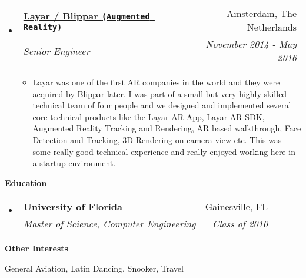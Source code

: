 \documentclass[letterpaper,11pt]{article}
\makeatletter
\newcommand{\resitem}[1]{\item #1 \vspace{-2pt}}
\newcommand{\resheading}[1]{{\large \colorbox{mygrey}{\begin{minipage}{\textwidth}{\textbf{#1 \vphantom{p\^{E}}}}\end{minipage}}}}
\newcommand{\ressubheading}[4]{
\begin{tabular*}{7.0in}{l@{\extracolsep{\fill}}r}
    \textbf{#1} & #2 \\
    \textit{#3} & \textit{#4} \\
\end{tabular*}\vspace{-6pt}}
\makeatother
\begin{document}
\begin{itemize}
\item
    \ressubheading{\href{https://www.layar.com/}{Layar / Blippar \texttt{(Augmented Reality)}}}{Amsterdam, The Netherlands}{Senior Engineer}{November 2014 - May 2016}
    \begin{itemize}
        \vspace{0.05in}
        \resitem{ Layar was one of the first AR companies in the world and they were acquired by Blippar later. I was part of a small but very highly skilled technical team of four people and we designed and implemented several core technical products like the Layar AR App, Layar AR SDK, Augmented Reality Tracking and Rendering, AR based walkthrough, Face Detection and Tracking, 3D Rendering on camera view etc. This was some really good technical experience and really enjoyed working here in a startup environment.  }
    \end{itemize}

\end{itemize}

\vspace{0.2in}
  
\resheading{Education}
\begin{itemize}
\item
    \ressubheading{University of Florida}{Gainesville, FL}{{Master of Science, Computer Engineering}}{Class of 2010}
\end{itemize}

\vspace{0.2in}

\resheading{Other Interests}
\begin{description}
\item General Aviation, Latin Dancing, Snooker, Travel
\end{description}
\end{document}
